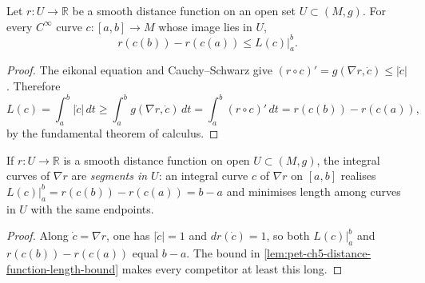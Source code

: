 \begin{lemma}
  \label{lem:pet-ch5-distance-function-length-bound}
  \leanok
  Let $r:U\to\mathbb R$ be a smooth distance function on an open set
  $U\subset(M,g)$. For every $C^\infty$ curve $c:[a,b]\to M$ whose image lies in
  $U$,
  \[
    r(c(b))-r(c(a))\le L(c)|_a^b.
  \]
\end{lemma}
\begin{proof}
  \leanok
  \sketch
  The eikonal equation and Cauchy--Schwarz give
  $(r\circ c)'=g(\nabla r,\dot c)\le|\dot c|$. Therefore
  \[
    L(c)=\int_a^b|\dot c|\,dt\ge\int_a^b g(\nabla r,\dot c)\,dt
      =\int_a^b (r\circ c)'\,dt=r(c(b))-r(c(a)),
  \]
    by the fundamental theorem of calculus.
\end{proof}

\begin{lemma}
  \label{lem:pet-ch5-distance-function-segments}
  \leanok
  If $r:U\to\mathbb R$ is a smooth distance function on open $U\subset(M,g)$, the
  integral curves of $\nabla r$ are \emph{segments in $U$}: an integral curve $c$
  of $\nabla r$ on $[a,b]$ realises $L(c)|_a^b=r(c(b))-r(c(a))=b-a$ and minimises
  length among curves in $U$ with the same endpoints.
\end{lemma}
\begin{proof}
  \leanok
  \sketch
  Along $\dot c=\nabla r$, one has $|\dot c|=1$ and $dr(\dot c)=1$, so both
  $L(c)|_a^b$ and $r(c(b))-r(c(a))$ equal $b-a$.  The bound in
  \cref{lem:pet-ch5-distance-function-length-bound} makes every competitor at
  least this long.
\end{proof}

